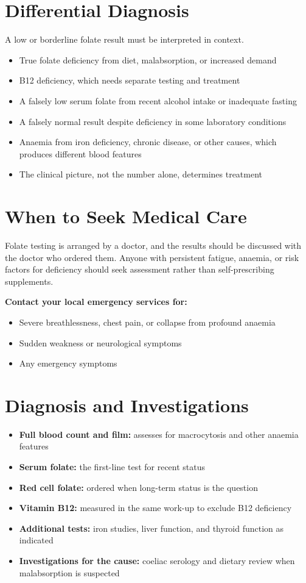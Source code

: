 \section*{Differential Diagnosis}
A low or borderline folate result must be interpreted in context.
\begin{itemize}
    \item True folate deficiency from diet, malabsorption, or increased demand
    \item B12 deficiency, which needs separate testing and treatment
    \item A falsely low serum folate from recent alcohol intake or inadequate fasting
    \item A falsely normal result despite deficiency in some laboratory conditions
    \item Anaemia from iron deficiency, chronic disease, or other causes, which produces different blood features
    \item The clinical picture, not the number alone, determines treatment
\end{itemize}

\section*{When to Seek Medical Care}
Folate testing is arranged by a doctor, and the results should be discussed with the doctor who ordered them. Anyone with persistent fatigue, anaemia, or risk factors for deficiency should seek assessment rather than self-prescribing supplements.

\textbf{Contact your local emergency services for:}
\begin{itemize}
    \item Severe breathlessness, chest pain, or collapse from profound anaemia
    \item Sudden weakness or neurological symptoms
    \item Any emergency symptoms
\end{itemize}

\section*{Diagnosis and Investigations}
\begin{itemize}
    \item \textbf{Full blood count and film:} assesses for macrocytosis and other anaemia features
    \item \textbf{Serum folate:} the first-line test for recent status
    \item \textbf{Red cell folate:} ordered when long-term status is the question
    \item \textbf{Vitamin B12:} measured in the same work-up to exclude B12 deficiency
    \item \textbf{Additional tests:} iron studies, liver function, and thyroid function as indicated
    \item \textbf{Investigations for the cause:} coeliac serology and dietary review when malabsorption is suspected
\end{itemize}

